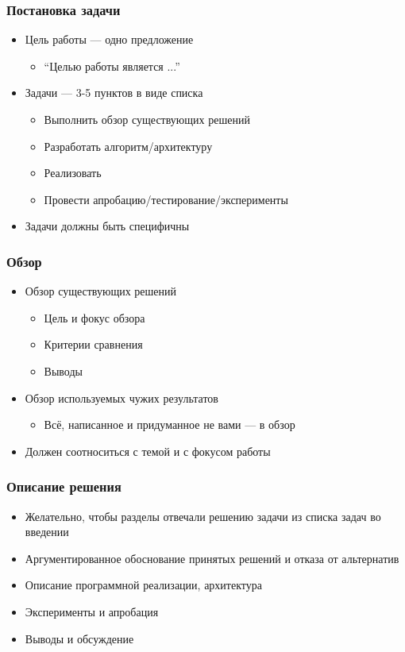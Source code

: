 \documentclass[xetex,mathserif,serif]{beamer}
\begin{document}
    \begin{frame}
        \frametitle{Постановка задачи}
        \begin{itemize}
            \item Цель работы --- одно предложение
            \begin{itemize}
                \item ``Целью работы является ...''
            \end{itemize}
            \item Задачи --- 3-5 пунктов в виде списка
            \begin{itemize}
                \item Выполнить обзор существующих решений
                \item Разработать алгоритм/архитектуру
                \item Реализовать
                \item Провести апробацию/тестирование/эксперименты
            \end{itemize}
            \item Задачи должны быть специфичны
        \end{itemize}
    \end{frame}

    \begin{frame}
        \frametitle{Обзор}
        \begin{itemize}
            \item Обзор существующих решений
            \begin{itemize}
                \item Цель и фокус обзора
                \item Критерии сравнения
                \item Выводы
            \end{itemize}
            \item Обзор используемых чужих результатов
            \begin{itemize}
                \item Всё, написанное и придуманное не вами --- в обзор
            \end{itemize}
            \item Должен соотноситься с темой и с фокусом работы
        \end{itemize}
    \end{frame}

    \begin{frame}
        \frametitle{Описание решения}
        \begin{itemize}
            \item Желательно, чтобы разделы отвечали решению задачи из списка задач во введении
            \item Аргументированное обоснование принятых решений и отказа от альтернатив
            \item Описание программной реализации, архитектура
            \item Эксперименты и апробация
            \item Выводы и обсуждение
        \end{itemize}
    \end{frame}
\end{document}
